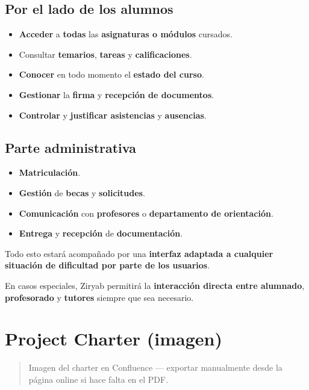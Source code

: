 \documentclass[
  spanish,
  11pt,
]{report}
\providecommand{\tightlist}{%
  \setlength{\itemsep}{0pt}\setlength{\parskip}{0pt}}
\begin{document}
\subsection{Por el lado de los
alumnos}\label{por-el-lado-de-los-alumnos}

\begin{itemize}
\tightlist
\item
  \textbf{Acceder} a \textbf{todas} las \textbf{asignaturas o módulos}
  cursados.
\item
  Consultar \textbf{temarios}, \textbf{tareas} y
  \textbf{calificaciones}.
\item
  \textbf{Conocer} en todo momento el \textbf{estado del curso}.
\item
  \textbf{Gestionar} la \textbf{firma} y \textbf{recepción de
  documentos}.
\item
  \textbf{Controlar} y \textbf{justificar asistencias} y
  \textbf{ausencias}.
\end{itemize}

\subsection{Parte administrativa}\label{parte-administrativa}

\begin{itemize}
\tightlist
\item
  \textbf{Matriculación}.
\item
  \textbf{Gestión} de \textbf{becas} y \textbf{solicitudes}.
\item
  \textbf{Comunicación} con \textbf{profesores} o \textbf{departamento
  de orientación}.
\item
  \textbf{Entrega} y \textbf{recepción} de \textbf{documentación}.
\end{itemize}

Todo esto estará acompañado por una \textbf{interfaz adaptada a
cualquier situación de dificultad por parte de los usuarios}.

En casos especiales, Ziryab permitirá la \textbf{interacción directa
entre alumnado}, \textbf{profesorado} y \textbf{tutores} siempre que sea
necesario.

\section{Project Charter (imagen)}\label{project-charter-imagen}

\begin{quote}
Imagen del charter en Confluence --- exportar manualmente desde la
página online si hace falta en el PDF.
\end{quote}
\end{document}
